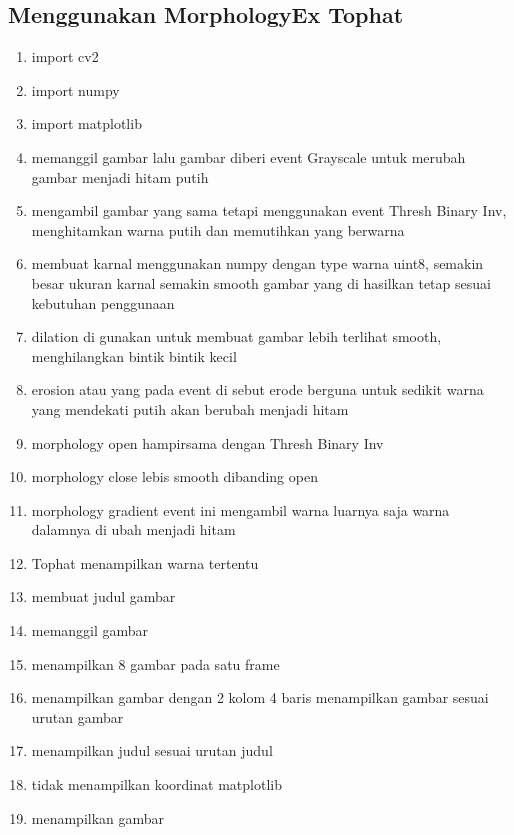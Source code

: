 \subsection{Menggunakan MorphologyEx Tophat}

\begin{enumerate}
	\item import cv2
	\item import numpy
	\item import matplotlib
	\item memanggil gambar lalu gambar diberi event Grayscale untuk merubah gambar menjadi hitam putih
	\item mengambil gambar yang sama tetapi menggunakan event Thresh Binary Inv, menghitamkan warna putih dan memutihkan yang berwarna
	\item membuat karnal menggunakan numpy dengan type warna uint8, semakin besar ukuran karnal semakin smooth gambar yang di hasilkan tetap sesuai kebutuhan penggunaan
	\item dilation di gunakan untuk membuat gambar lebih terlihat smooth, menghilangkan bintik bintik kecil
	\item erosion atau yang pada event di sebut erode berguna untuk sedikit warna yang mendekati putih akan berubah menjadi hitam
	\item morphology open hampirsama dengan Thresh Binary Inv
	\item morphology close lebis smooth dibanding open
	\item morphology gradient event ini mengambil warna luarnya saja warna dalamnya di ubah menjadi hitam
	\item Tophat menampilkan warna tertentu
	\item membuat judul gambar
	\item memanggil gambar
	\item menampilkan 8 gambar pada satu frame
	\item menampilkan gambar dengan 2 kolom 4 baris menampilkan gambar sesuai urutan gambar
	\item menampilkan judul sesuai urutan judul
	\item tidak menampilkan koordinat matplotlib
	\item menampilkan gambar
\end{enumerate}

